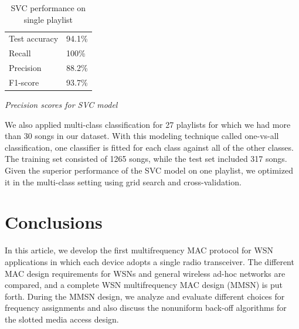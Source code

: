 \documentclass[acmtog, authorversion]{acmart}
\begin{document}
\newpage
\begin{table}%
\caption{SVC performance on single playlist}
\label{tab:one}
\begin{minipage}{\columnwidth}
\begin{center}
\begin{tabular}{ll}
  \toprule
  Test accuracy    & 94.1\%\\
  Recall  & 100\%\\
  Precision    & 88.2\%\\
  F1-score    & 93.7\%\\
  \bottomrule
\end{tabular}
\end{center}
\bigskip\centering
\footnotesize
 \emph{Precision scores for SVC model} 
\end{minipage}
\end{table}%
\newpage
We also applied multi-class classification for 27 playlists for which we had more than 30 songs in our dataset. With this modeling technique called one-vs-all classification, one classifier is fitted for each class against all of the other classes. The training set consisted of 1265 songs, while the test set included 317 songs. Given the superior performance of the SVC model on one playlist, we optimized it in the multi-class setting using grid search and cross-validation.  



\section{Conclusions}

In this article, we develop the first multifrequency MAC protocol for
WSN applications in which each device adopts a
single radio transceiver. The different MAC design requirements for
WSNs and general wireless ad-hoc networks are
compared, and a complete WSN multifrequency MAC design (MMSN) is
put forth. During the MMSN design, we analyze and evaluate different
choices for frequency assignments and also discuss the nonuniform
back-off algorithms for the slotted media access design.

\end{document}
